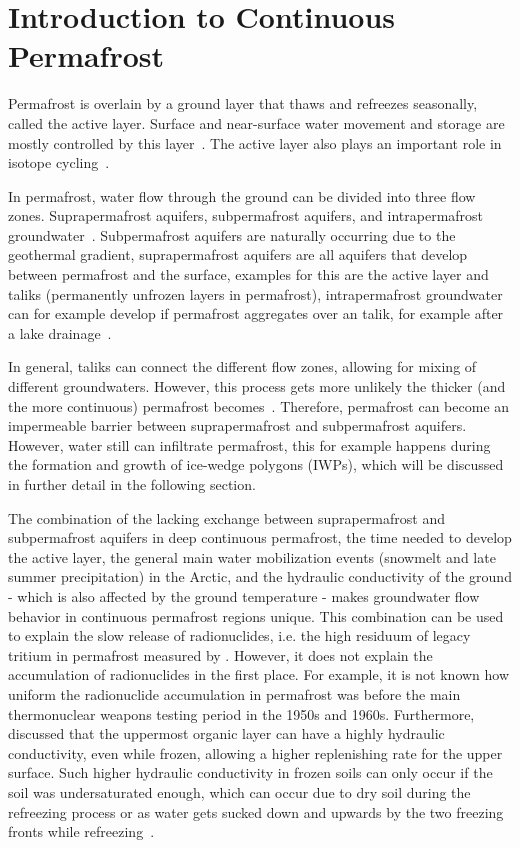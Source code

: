 \chapter{Introduction to Continuous Permafrost}
Permafrost is overlain by a ground layer that thaws and refreezes seasonally, called the active layer. Surface and near-surface water movement and storage are mostly controlled by this layer~\citep{walvoordHydrologicImpactsThawing2016}. The active layer also plays an important role in isotope cycling~\citep{tetzlaffTracerbasedAssessmentFlow2015}.

In permafrost, water flow through the ground can be divided into three flow zones. Suprapermafrost aquifers, subpermafrost aquifers, and intrapermafrost groundwater~\citep{walvoordHydrologicImpactsThawing2016,wooPermafrostHydrology2012}. Subpermafrost aquifers are naturally occurring due to the geothermal gradient, suprapermafrost aquifers are all aquifers that develop between permafrost and the surface, examples for this are the active layer and taliks (permanently unfrozen layers in permafrost), intrapermafrost groundwater can for example develop if permafrost aggregates over an talik, for example after a lake drainage~\citep{walvoordHydrologicImpactsThawing2016,wooPermafrostHydrology2012}.

In general, taliks can connect the different flow zones, allowing for mixing of different groundwaters. However, this process gets more unlikely the thicker (and the more continuous) permafrost becomes~\citep{wooPermafrostHydrology2012}. Therefore, permafrost can become an impermeable barrier between suprapermafrost and subpermafrost aquifers. However, water still can infiltrate permafrost, this for example happens during the formation and growth of ice-wedge polygons (IWPs), which will be discussed in further detail in the following section.

The combination of the lacking exchange between suprapermafrost and subpermafrost aquifers in deep continuous permafrost, the time needed to develop the active layer, the general main water mobilization events (snowmelt and late summer precipitation) in the Arctic, and the hydraulic conductivity of the ground - which is also affected by the ground temperature - makes groundwater flow behavior in continuous permafrost regions unique. 
This combination can be used to explain the slow release of radionuclides, i.e. the high residuum of legacy tritium in permafrost measured by \citet{bondPermafrostThawImplications2018}. However, it does not explain the accumulation of radionuclides in the first place. For example, it is not known how uniform the radionuclide accumulation in permafrost was before the main thermonuclear weapons testing period in the 1950s and 1960s. 
Furthermore, \citet{quintonSubsurfaceDrainageHummockcovered2000} discussed that the uppermost organic layer can have a highly hydraulic conductivity, even while frozen, allowing a higher replenishing rate for the upper surface. Such higher hydraulic conductivity in frozen soils can only occur if the soil was undersaturated enough, which can occur due to dry soil during the refreezing process or as water gets sucked down and upwards by the two freezing fronts while refreezing~\citep{mackayOriginHummocksWestern1980}.

